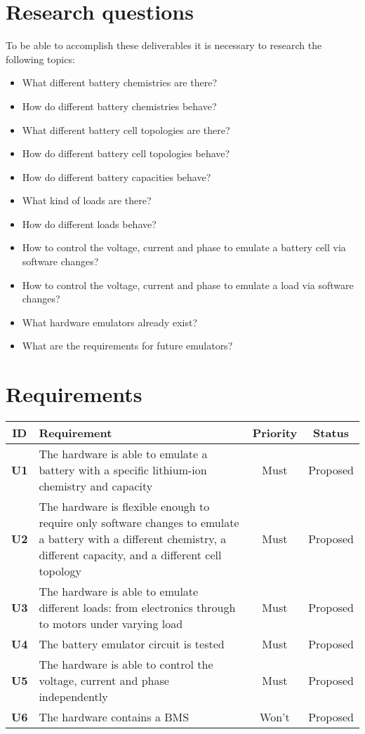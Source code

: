 \section{Research questions}
To be able to accomplish these deliverables it is necessary to research the following topics:
\begin{itemize}
    \item What different battery chemistries are there?
    \item How do different battery chemistries behave?
    \item What different battery cell topologies are there?
    \item How do different battery cell topologies behave?
    \item How do different battery capacities behave?
    \item What kind of loads are there?
    \item How do different loads behave?
    \item How to control the voltage, current and phase to emulate a battery cell via software changes?
    \item How to control the voltage, current and phase to emulate a load via software changes?
    \item What hardware emulators already exist?
    \item What are the requirements for future emulators?
\end{itemize}

\section{Requirements}
\begin{longtable}{|c|p{10cm}|c|c|}
    \hline
    \textbf{ID} & \textbf{Requirement} & \textbf{Priority} & \textbf{Status}\\ \hline 
    \textbf{U1} & The hardware is able to emulate a battery with a specific lithium-ion chemistry and capacity & Must & Proposed\\ \hline
    \textbf{U2} & The hardware is flexible enough to require only software changes to emulate a battery with a different chemistry, a different capacity, and a different cell topology & Must & Proposed\\ \hline
    \textbf{U3} & The hardware is able to emulate different loads: from electronics through to motors under varying load & Must & Proposed\\ \hline
    \textbf{U4} & The battery emulator circuit is tested & Must & Proposed\\ \hline
    \textbf{U5} & The hardware is able to control the voltage, current and phase independently & Must & Proposed\\ \hline
    \textbf{U6} & The hardware contains a BMS & Won't & Proposed\\ \hline
\end{longtable}
